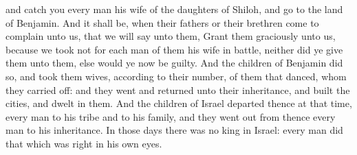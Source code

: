 and catch you every man his wife of the daughters of Shiloh, and go to the land of Benjamin. And it shall be, when their fathers or their brethren come to complain unto us, that we will say unto them, Grant them graciously unto us, because we took not for each man of them his wife in battle, neither did ye give them unto them, else would ye now be guilty. And the children of Benjamin did so, and took them wives, according to their number, of them that danced, whom they carried off: and they went and returned unto their inheritance, and built the cities, and dwelt in them. And the children of Israel departed thence at that time, every man to his tribe and to his family, and they went out from thence every man to his inheritance.  In those days there was no king in Israel: every man did that which was right in his own eyes. 